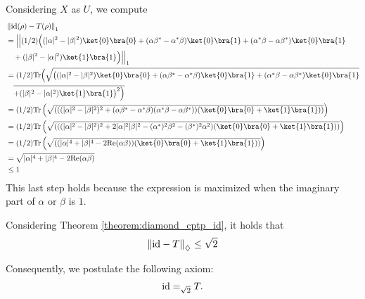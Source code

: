 \begin{example}
Considering $X$ as $U$, we compute
\begin{align*}
  &  \tracenorm{ \id(\rho) - T(\rho)} \\
  &  = \Big|\Big| (1/2) \Big( (|\alpha|^2 -|\beta|^2) \ket{0}\bra{0} + (\alpha \beta^*-\alpha^* \beta)\ket{0}\bra{1} + (\alpha^* \beta-\alpha \beta^*)\ket{0}\bra{1}    \\
  & \hspace{10pt}  + (|\beta|^2 -|\alpha|^2 )\ket{1}\bra{1} \Big) \Big|\Big|_1  \\
  &  = (1/2) \tr \Big( \sqrt{\big( (|\alpha|^2 -|\beta|^2) \ket{0}\bra{0} + (\alpha \beta^*-\alpha^* \beta)\ket{0}\bra{1} + (\alpha^* \beta-\alpha \beta^*)\ket{0}\bra{1} }  \\
  & \hspace{10pt} \overline{+(|\beta|^2 -|\alpha|^2 )\ket{1}\bra{1}   \big)^2\Big)}\\
  &  = (1/2) \tr \left( \sqrt{\left( ((|\alpha|^2 -|\beta|^2 )^2 + (\alpha \beta^*-\alpha^* \beta)(\alpha^* \beta-\alpha \beta^*))  (\ket{0}\bra{0} + \ket{1}\bra{1})  \right)}\right)  \\
  &  = (1/2) \tr \left( \sqrt{\left( ((|\alpha|^2 -|\beta|^2 )^2 + 2|\alpha|^2|\beta|^2 - (\alpha^{*})^{2}\beta^2 -  (\beta^{*})^{2}\alpha^2 )  (\ket{0}\bra{0} + \ket{1}\bra{1})  \right)}\right) \\
  &  = (1/2) \tr \left( \sqrt{\left( (|\alpha|^4+ |\beta|^4 - 2 \text{Re}(\alpha \beta) )  (\ket{0}\bra{0} + \ket{1}\bra{1})  \right)}\right) \\
  & =  \sqrt{|\alpha|^4+ |\beta|^4 - 2 \text{Re}(\alpha \beta)} \\
  & \leq 1
\end{align*}
This last step holds because the expression is maximized when the imaginary part of $\alpha$ or $\beta$ is $1$.

Considering Theorem \ref{theorem:diamond_cptp_id}, it holds that
\begin{align*}
  \left\lVert  \mathrm{id} - T \right\rVert_{\diamondsuit} \leq \sqrt{2}
\end{align*}

Consequently, we postulate the following axiom:
    \begin{align} \label{eq:t_teleport}
        \mathrm{id} =_{ \sqrt{2}} T.
    \end{align}


\end{example}
